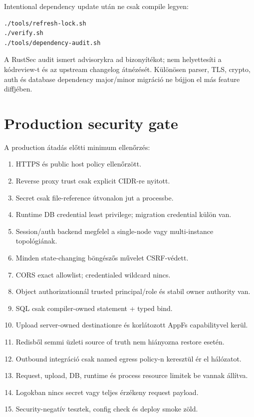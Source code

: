 Intentional dependency update után ne csak compile legyen:

\begin{lstlisting}
./tools/refresh-lock.sh
./verify.sh
./tools/dependency-audit.sh
\end{lstlisting}

A RustSec audit ismert advisorykra ad bizonyítékot; nem helyettesíti a kódreview-t és az upstream changelog átnézését. Különösen parser, TLS, crypto, auth és database dependency major/minor migráció ne bújjon el más feature diffjében.

\section{Production security gate}

A production átadás előtti minimum ellenőrzés:

\begin{enumerate}
  \item HTTPS és public host policy ellenőrzött.
  \item Reverse proxy trust csak explicit CIDR-re nyitott.
  \item Secret csak file-reference útvonalon jut a processbe.
  \item Runtime DB credential least privilege; migration credential külön van.
  \item Session/auth backend megfelel a single-node vagy multi-instance topológiának.
  \item Minden state-changing böngészős művelet CSRF-védett.
  \item CORS exact allowlist; credentialed wildcard nincs.
  \item Object authorizationnál trusted principal/role és stabil owner authority van.
  \item SQL csak compiler-owned statement + typed bind.
  \item Upload server-owned destinationre és korlátozott AppFs capabilityvel kerül.
  \item Redisből semmi üzleti source of truth nem hiányozna restore esetén.
  \item Outbound integráció csak named egress policy-n keresztül ér el hálózatot.
  \item Request, upload, DB, runtime és process resource limitek be vannak állítva.
  \item Logokban nincs secret vagy teljes érzékeny request payload.
  \item Security-negatív tesztek, config check és deploy smoke zöld.
\end{enumerate}

